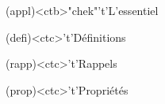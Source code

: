 \documentclass[../../main/main.tex]{subfiles}
\begin{document}
\vspace*{\fill}

\newpage

\vspace*{\fill}
\begin{tcn}[sidebyside, fontupper=\small, fontlower=\small](appl)<ctb>"chek"'t'{L'essentiel}
	\begin{tcn}(defi)<ctc>'t'{Définitions}
	\end{tcn}
	\begin{tcn}(rapp)<ctc>'t'{Rappels}
	\end{tcn}
	\begin{tcn}(prop)<ctc>'t'{Propriétés}
	\end{tcn}

\end{tcn}
\end{document}
